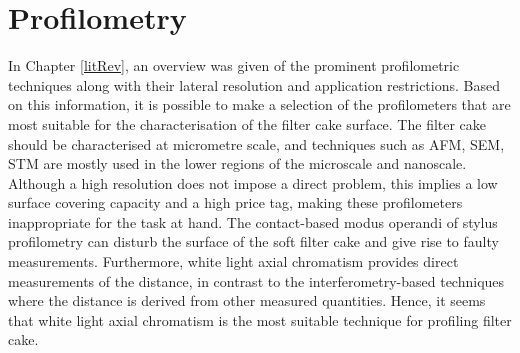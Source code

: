 \section{Profilometry}
In Chapter \ref{litRev}, an overview was given of the prominent profilometric techniques along with their lateral resolution and application restrictions. Based on this information, it is possible to make a selection of the profilometers that are most suitable for the characterisation of the filter cake surface. The filter cake should be characterised at micrometre scale, and techniques such as \gls{AFM}, \gls{SEM}, \gls{STM} are mostly used in the lower regions of the microscale and nanoscale. Although a high resolution does not impose a direct problem, this implies a low surface covering capacity and a high price tag, making these profilometers inappropriate for the task at hand. The contact-based modus operandi of stylus profilometry can disturb the surface of the soft filter cake and give rise to faulty measurements. %
Furthermore, white light axial chromatism provides direct measurements of the distance, in contrast to the interferometry-based techniques where the distance is derived from other measured quantities. Hence, it seems that white light axial chromatism is the most suitable technique for profiling filter cake.

\clearpage
\clearpage{\pagestyle{empty}\cleardoublepage}

